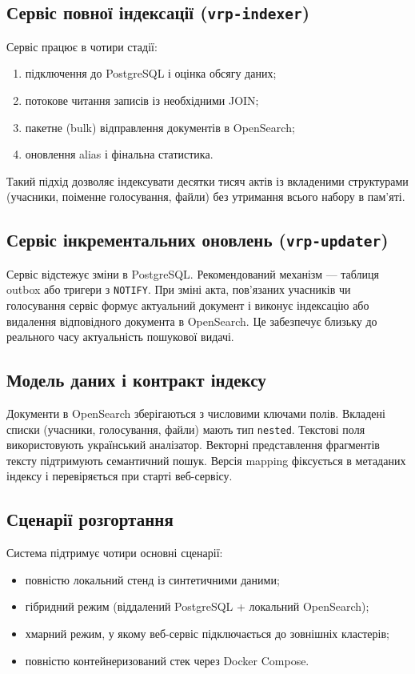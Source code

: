 \documentclass[12pt,a4paper]{article}
\begin{document}
\subsection{Сервіс повної індексації (\texttt{vrp-indexer})}

Сервіс працює в чотири стадії:
\begin{enumerate}
  \item підключення до PostgreSQL і оцінка обсягу даних;
  \item потокове читання записів із необхідними JOIN;
  \item пакетне (bulk) відправлення документів в OpenSearch;
  \item оновлення alias і фінальна статистика.
\end{enumerate}

Такий підхід дозволяє індексувати десятки тисяч актів із вкладеними структурами (учасники, поіменне голосування, файли) без утримання всього набору в пам'яті.

\subsection{Сервіс інкрементальних оновлень (\texttt{vrp-updater})}

Сервіс відстежує зміни в PostgreSQL. Рекомендований механізм — таблиця outbox або тригери з \texttt{NOTIFY}. При зміні акта, пов'язаних учасників чи голосування сервіс формує актуальний документ і виконує індексацію або видалення відповідного документа в OpenSearch. Це забезпечує близьку до реального часу актуальність пошукової видачі.

\subsection{Модель даних і контракт індексу}

Документи в OpenSearch зберігаються з числовими ключами полів. Вкладені списки (учасники, голосування, файли) мають тип \texttt{nested}. Текстові поля використовують український аналізатор. Векторні представлення фрагментів тексту підтримують семантичний пошук. Версія mapping фіксується в метаданих індексу і перевіряється при старті веб-сервісу.

\subsection{Сценарії розгортання}

Система підтримує чотири основні сценарії:
\begin{itemize}
  \item повністю локальний стенд із синтетичними даними;
  \item гібридний режим (віддалений PostgreSQL + локальний OpenSearch);
  \item хмарний режим, у якому веб-сервіс підключається до зовнішніх кластерів;
  \item повністю контейнеризований стек через Docker Compose.
\end{itemize}
\end{document}
